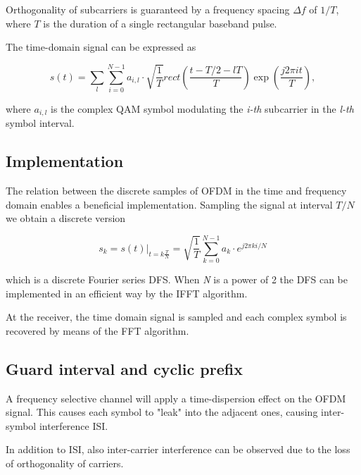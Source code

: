 Orthogonality of subcarriers is guaranteed by a frequency spacing $\Delta f$ of $1/T$, where $T$ is the duration of a single rectangular baseband pulse.

The time-domain signal can be expressed as

\begin{equation}
    s(t) = \sum_l\sum_{i=0}^{N-1} a_{i,l}\cdot \sqrt{\frac{1}{T}} rect \left( \frac{t-T/2 - lT}{T} \right)\exp{\left(\frac{j2\pi it}{T}\right)},
\end{equation}

where $a_{i,l}$ is the complex QAM symbol modulating the \textit{i-th} subcarrier in the \textit{l-th} symbol interval.

\subsection{Implementation}
The relation between the discrete samples of OFDM in the time and frequency domain enables a beneficial implementation.
Sampling the signal at interval $T/N$ we obtain a discrete version

\begin{equation}
    s_k = s(t)|_{t=k \frac{T}{N}} = \sqrt{\frac{1}{T}}\sum_{k=0}^{N-1} a_k \cdot e^{j2\pi ki/N}
\end{equation}

which is a discrete Fourier series DFS. When \textit{N} is a power of 2 the DFS can be implemented in an efficient way by the IFFT algorithm.

At the receiver, the time domain signal is sampled and each complex symbol is recovered by means of the FFT algorithm.

\subsection{Guard interval and cyclic prefix}
A frequency selective channel will apply a time-dispersion effect on the OFDM signal. This causes each symbol to "leak" into the adjacent ones, causing inter-symbol interference ISI.

In addition to ISI, also inter-carrier interference can be observed due to the loss of orthogonality of carriers.

